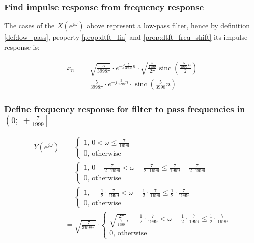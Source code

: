\documentclass[a4paper]{article}
\theoremstyle{break}
\theoremstyle{break}
\DeclareMathOperator{\sinc}{sinc}
\begin{document}
\subsubsection*{Find impulse response from frequency response}

The cases of the $X(e^{j \omega})$ above represent a low-pass filter, hence by definition \ref{def:low_pass}, property \ref{prop:dtft_lin} and \ref{prop:dtft_freq_shift} its impulse response is:

\begin{equation} \label{eq_t2:x_n}
  \begin{split}
    x_n &= \sqrt{\frac{5}{3998 \pi}} \cdot e^{-j \frac{5}{3998} n} \cdot \sqrt{\frac{\frac{5}{1999}}{2 \pi}} \sinc \left( \frac{\frac{5}{1999} n} {2} \right) \\
        &= \frac{5}{3998 \pi} \cdot e^{-j \frac{5}{3998} n} \cdot \sinc \left( \frac{5}{3998} n \right)
  \end{split}
\end{equation}

\subsubsection*{Define frequency response for filter to pass frequencies in $\left( 0; \; +\frac{7}{1999} \right]$}

\begin{equation*}
  \begin{split}
    Y(e^{j \omega}) &= \begin{cases}
                         1, \, 0 < \omega \leq \frac{7}{1999} \\
                         0, \, \text{otherwise}
                       \end{cases} \\
                    &= \begin{cases}
                         1, \, 0 - \frac{7}{2 \cdot 1999} < \omega - \frac{7}{2 \cdot 1999} \leq \frac{7}{1999} - \frac{7}{2 \cdot 1999} \\
                         0, \, \text{otherwise}
                       \end{cases} \\
                    &= \begin{cases}
                         1, \, - \frac{1}{2} \cdot \frac{7}{1999} < \omega - \frac{1}{2} \cdot \frac{7}{1999} \leq \frac{1}{2} \cdot \frac{7}{1999} \\
                         0, \, \text{otherwise}
                       \end{cases} \\
                    &= \sqrt{\frac{7}{3998 \pi}} \cdot
                       \begin{cases}
                         \sqrt{\frac{2 \pi}{\frac{7}{1999}}}, \, - \frac{1}{2} \cdot \frac{7}{1999} < \omega - \frac{1}{2} \cdot \frac{7}{1999} \leq \frac{1}{2} \cdot \frac{7}{1999} \\
                         0, \, \text{otherwise}
                       \end{cases}
  \end{split}
\end{equation*}
\end{document}
